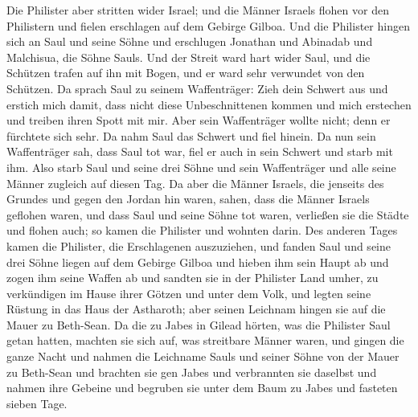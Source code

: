  Die Philister aber stritten wider Israel; und die Männer
Israels flohen vor den Philistern und fielen erschlagen auf dem Gebirge
Gilboa.  Und die Philister hingen sich an Saul und seine
Söhne und erschlugen Jonathan und Abinadab und Malchisua, die Söhne
Sauls.  Und der Streit ward hart wider Saul, und die
Schützen trafen auf ihn mit Bogen, und er ward sehr verwundet von den
Schützen.  Da sprach Saul zu seinem Waffenträger: Zieh
dein Schwert aus und erstich mich damit, dass nicht diese
Unbeschnittenen kommen und mich erstechen und treiben ihren Spott mit
mir. Aber sein Waffenträger wollte nicht; denn er fürchtete sich sehr.
Da nahm Saul das Schwert und fiel hinein.  Da nun sein
Waffenträger sah, dass Saul tot war, fiel er auch in sein Schwert und
starb mit ihm.  Also starb Saul und seine drei Söhne und
sein Waffenträger und alle seine Männer zugleich auf diesen Tag.
 Da aber die Männer Israels, die jenseits des Grundes und
gegen den Jordan hin waren, sahen, dass die Männer Israels geflohen
waren, und dass Saul und seine Söhne tot waren, verließen sie die Städte
und flohen auch; so kamen die Philister und wohnten darin.
 Des anderen Tages kamen die Philister, die Erschlagenen
auszuziehen, und fanden Saul und seine drei Söhne liegen auf dem Gebirge
Gilboa  und hieben ihm sein Haupt ab und zogen ihm seine
Waffen ab und sandten sie in der Philister Land umher, zu verkündigen im
Hause ihrer Götzen und unter dem Volk,  und legten seine
Rüstung in das Haus der Astharoth; aber seinen Leichnam hingen sie auf
die Mauer zu Beth-Sean.  Da die zu Jabes in Gilead
hörten, was die Philister Saul getan hatten,  machten sie
sich auf, was streitbare Männer waren, und gingen die ganze Nacht und
nahmen die Leichname Sauls und seiner Söhne von der Mauer zu Beth-Sean
und brachten sie gen Jabes und verbrannten sie daselbst 
und nahmen ihre Gebeine und begruben sie unter dem Baum zu Jabes und
fasteten sieben Tage.
